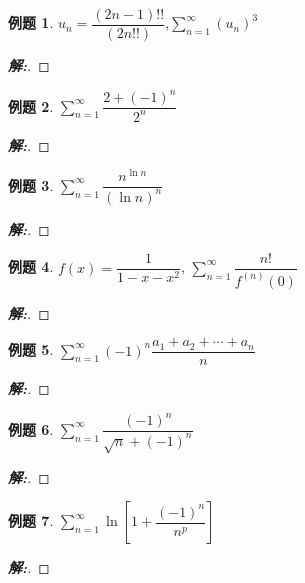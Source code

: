 \documentclass[12pt,a4paper]{ctexart}
\newenvironment{solution}{\begin{proof}[\hspace{2em}\textbf{解:}]}{\end{proof}}
\theoremstyle{definition}%
\newtheorem{exercise}{\hspace{2em}例题}
\begin{document}
\begin{exercise}
	$ u_n=\dfrac{(2n-1)!!}{(2n!!)} $,$ \displaystyle\sum_{n=1}^{\infty}(u_n)^3 $
\end{exercise}
\begin{solution}
	
\end{solution}

\begin{exercise}
	$ \displaystyle\sum_{n=1}^{\infty}\dfrac{2+(-1)^n}{2^n} $
\end{exercise}
\begin{solution}
	
\end{solution}

\begin{exercise}
	$ \displaystyle\sum_{n=1}^{\infty}\dfrac{n^{\ln n}}{(\ln n)^n} $
\end{exercise}
\begin{solution}
	
\end{solution}

\begin{exercise}
	$ f(x)=\dfrac{1}{1-x-x^2} $, $ \displaystyle\sum_{n=1}^{\infty}\dfrac{n!}{f^{(n)}(0)} $
\end{exercise}
\begin{solution}
	
\end{solution}

\begin{exercise}
	$ \displaystyle\sum_{n=1}^{\infty} (-1)^n \dfrac{a_1+a_2+\cdots+a_n}{n} $
\end{exercise}
\begin{solution}
	
\end{solution}

\begin{exercise}
	$ \displaystyle\sum_{n=1}^{\infty} \dfrac{(-1)^n}{\sqrt{n}+(-1)^n} $
\end{exercise}
\begin{solution}
	
\end{solution}

\begin{exercise}
	$ \displaystyle\sum_{n=1}^{\infty} \ln[1+\dfrac{(-1)^n}{n^p}] $
\end{exercise}
\begin{solution}
	
\end{solution}
\end{document}
